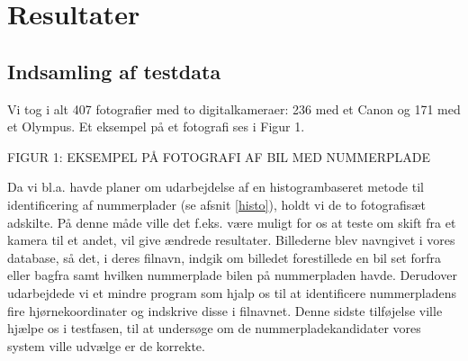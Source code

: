 \section{Resultater}

\subsection{Indsamling af testdata}





Vi tog i alt 407 fotografier med to digitalkameraer: 236 med et Canon og 171 med et Olympus. Et eksempel på et fotografi ses i Figur 1.%

FIGUR 1: EKSEMPEL PÅ FOTOGRAFI AF BIL MED NUMMERPLADE


Da vi bl.a. havde planer om udarbejdelse af en histogrambaseret metode til identificering af nummerplader (se afsnit \ref{histo}), holdt vi de to fotografisæt adskilte. På denne måde ville det f.eks. være muligt for os at teste om skift fra et kamera til et andet, vil give ændrede resultater. Billederne blev navngivet i vores database, så det, i deres filnavn, indgik om billedet forestillede en bil set forfra eller bagfra samt hvilken nummerplade bilen på nummerpladen havde. Derudover udarbejdede vi et mindre program som hjalp os til at identificere nummerpladens fire hjørnekoordinater og indskrive disse i filnavnet. Denne sidste tilføjelse ville hjælpe os i testfasen, til at undersøge om de nummerpladekandidater vores system ville udvælge er de korrekte.





